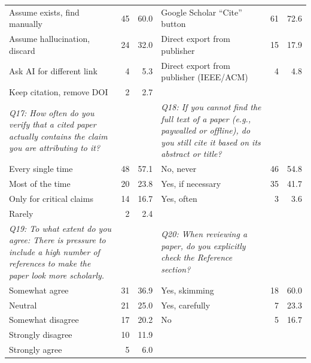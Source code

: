 \begin{table}[htbp]
\begin{threeparttable}
\begin{tabular}{p{6cm}rr|p{6cm}rr}
Assume exists, find manually & 45 & 60.0 & Google Scholar ``Cite'' button & 61 & 72.6 \\
Assume hallucination, discard & 24 & 32.0 & Direct export from publisher & 15 & 17.9 \\
\rowcolor{tableRowLight}
Ask AI for different link & 4 & 5.3 & Direct export from publisher (IEEE/ACM) & 4 & 4.8 \\
\rowcolor{tableRowLight}
Keep citation, remove DOI & 2 & 2.7 &  &  &  \\
\midrule
\textit{Q17: How often do you verify that a cited paper actually contains the claim you are attributing to it?} & & & \textit{Q18: If you cannot find the full text of a paper (e.g., paywalled or offline), do you still cite it based on its abstract or title?} & & \\
\rowcolor{tableRowLight}
Every single time & 48 & 57.1 & No, never & 46 & 54.8 \\
Most of the time & 20 & 23.8 & Yes, if necessary & 35 & 41.7 \\
\rowcolor{tableRowLight}
Only for critical claims & 14 & 16.7 & Yes, often & 3 & 3.6 \\
Rarely & 2 & 2.4 &  &  &  \\
\midrule
\textit{Q19: To what extent do you agree: There is pressure to include a high number of references to make the paper look more scholarly.} & & & \textit{Q20: When reviewing a paper, do you explicitly check the Reference section?} & & \\
\rowcolor{tableRowLight}
Somewhat agree & 31 & 36.9 & Yes, skimming & 18 & 60.0 \\
Neutral & 21 & 25.0 & Yes, carefully & 7 & 23.3 \\
\rowcolor{tableRowLight}
Somewhat disagree & 17 & 20.2 & No & 5 & 16.7 \\
Strongly disagree & 10 & 11.9 &  &  &  \\
\rowcolor{tableRowLight}
Strongly agree & 5 & 6.0 &  &  &  \\
\bottomrule
    \end{tabular}
  \end{threeparttable}
\end{table}

